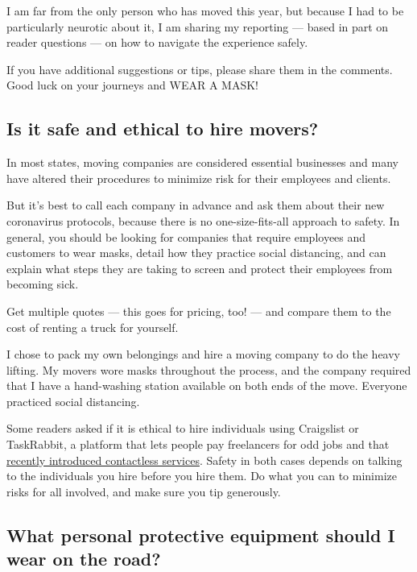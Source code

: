 I am far from the only person who has moved this year, but because I had
to be particularly neurotic about it, I am sharing my reporting ---
based in part on reader questions --- on how to navigate the experience
safely.

If you have additional suggestions or tips, please share them in the
comments. Good luck on your journeys and WEAR A MASK!

\hypertarget{is-it-safe-and-ethical-to-hire-movers}{%
\subsection{Is it safe and ethical to hire
movers?}\label{is-it-safe-and-ethical-to-hire-movers}}

In most states, moving companies are considered essential businesses and
many have altered their procedures to minimize risk for their employees
and clients.

But it's best to call each company in advance and ask them about their
new coronavirus protocols, because there is no one-size-fits-all
approach to safety. In general, you should be looking for companies that
require employees and customers to wear masks, detail how they practice
social distancing, and can explain what steps they are taking to screen
and protect their employees from becoming sick.

Get multiple quotes --- this goes for pricing, too! --- and compare them
to the cost of renting a truck for yourself.

I chose to pack my own belongings and hire a moving company to do the
heavy lifting. My movers wore masks throughout the process, and the
company required that I have a hand-washing station available on both
ends of the move. Everyone practiced social distancing.

Some readers asked if it is ethical to hire individuals using Craigslist
or TaskRabbit, a platform that lets people pay freelancers for odd jobs
and that
\href{https://support.taskrabbit.com/hc/en-us/articles/360040752692-COVID-19-Updates}{recently
introduced contactless services}. Safety in both cases depends on
talking to the individuals you hire before you hire them. Do what you
can to minimize risks for all involved, and make sure you tip
generously.

\hypertarget{what-personal-protective-equipment-should-i-wear-on-the-road}{%
\subsection{What personal protective equipment should I wear on the
road?}\label{what-personal-protective-equipment-should-i-wear-on-the-road}}


